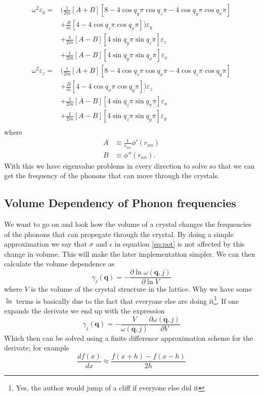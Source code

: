 \documentclass[11pt]{article}
\begin{document}
\begin{align}
	\omega^2\varepsilon_y = &\big( \frac{1}{2m} [A+B][8-4\cos{q_y\pi}\cos{q_z\pi}-4\cos{q_y\pi}\cos{q_x\pi}] \\
	&+ \frac{B}{m}[4-4\cos{q_z\pi}\cos{q_x\pi}]\big)\varepsilon_y \\
	&+\frac{1}{2m}[A-B][4\sin{q_y\pi}\sin{q_z\pi}]\varepsilon_z \\
	&+\frac{1}{2m}[A-B][4\sin{q_y\pi}\sin{q_x\pi}]\varepsilon_x \\
	\omega^2\varepsilon_z = &\big( \frac{1}{2m} [A+B][8-4\cos{q_z\pi}\cos{q_x\pi}-4\cos{q_z\pi}\cos{q_y\pi}] \\
	&+ \frac{B}{m}[4-4\cos{q_x\pi}\cos{q_y\pi}]\big)\varepsilon_z \\
	&+\frac{1}{2m}[A-B][4\sin{q_z\pi}\sin{q_x\pi}]\varepsilon_x \\
	&+\frac{1}{2m}[A-B][4\sin{q_z\pi}\sin{q_y\pi}]\varepsilon_y \\
	\label{eq:omegaRest}
\end{align}
where
\begin{align}
	A &\equiv \frac{1}{r_{nn}} \phi'(r_{nn}) \\
	B &\equiv \phi''(r_{nn}).
	\label{eq:AB}
\end{align}
With this we have eigenvalue problems in every direction to solve so that we can get the frequency of the phonons that can move through the crystals. 
\subsection{Volume Dependency of Phonon frequencies}
We want to go on and look how the volume of a crystal changes the frequencies of the phonons that can propegate through the crystal. By doing a simple approximation we say that $\sigma$ and $\epsilon$ in equation \ref{eq:pot} is not affected by this change in volume. This will make the later implementation simpler. We can then calculate the volume dependence as 
\begin{equation}
	\gamma_j(\mathbf{q}) = - \frac{\partial \ln{ \omega(\mathbf{q},j)}}{\partial \ln{V}}
\end{equation}
where $V$ is the volume of the crystal structure in the lattice. Why we have some $\ln$ terms is basically due to the fact that everyone else are doing it\footnote{Yes, the author would jump of a cliff if everyone else did it}. If one expands the derivate we end up with the expression
\begin{equation}
	\gamma_j(\mathbf{q}) =  -\frac{V}{\omega(\mathbf{q},j)} \frac{\partial \omega(\mathbf{q},j)}{\partial V}
	\label{eq:volDep}
\end{equation}
Which then can be solved using a finite difference approximation scheme for the derivate; for example
\begin{equation}
	\frac{df(x)}{dx} \approx \frac{f(x+h)-f(x-h)}{2h}
	\label{eq:derivate}
\end{equation}
\end{document}
